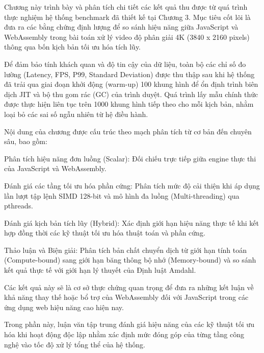 

Chương này trình bày và phân tích chi tiết các kết quả thu được từ quá trình thực nghiệm hệ thống benchmark đã thiết kế tại Chương 3. Mục tiêu cốt lõi là đưa ra các bằng chứng định lượng để so sánh hiệu năng giữa JavaScript và WebAssembly trong bài toán xử lý video độ phân giải 4K (3840 x 2160 pixels) thông qua bốn kịch bản tối ưu hóa tích lũy.


Để đảm bảo tính khách quan và độ tin cậy của dữ liệu, toàn bộ các chỉ số đo lường (Latency, FPS, P99, Standard Deviation) được thu thập sau khi hệ thống đã trải qua giai đoạn khởi động (warm-up) 100 khung hình để ổn định trình biên dịch JIT và bộ thu gom rác (GC) của trình duyệt. Quá trình lấy mẫu chính thức được thực hiện liên tục trên 1000 khung hình tiếp theo cho mỗi kịch bản, nhằm loại bỏ các sai số ngẫu nhiên từ hệ điều hành.


Nội dung của chương được cấu trúc theo mạch phân tích từ cơ bản đến chuyên sâu, bao gồm:


Phân tích hiệu năng đơn luồng (Scalar): Đối chiếu trực tiếp giữa engine thực thi của JavaScript và WebAssembly.


Đánh giá các tầng tối ưu hóa phần cứng: Phân tích mức độ cải thiện khi áp dụng lần lượt tập lệnh SIMD 128-bit và mô hình đa luồng (Multi-threading) qua pthreads.


Đánh giá kịch bản tích lũy (Hybrid): Xác định giới hạn hiệu năng thực tế khi kết hợp đồng thời các kỹ thuật tối ưu hóa thuật toán và phần cứng.


Thảo luận và Biện giải: Phân tích bản chất chuyển dịch từ giới hạn tính toán (Compute-bound) sang giới hạn băng thông bộ nhớ (Memory-bound) và so sánh kết quả thực tế với giới hạn lý thuyết của Định luật Amdahl.


Các kết quả này sẽ là cơ sở thực chứng quan trọng để đưa ra những kết luận về khả năng thay thế hoặc bổ trợ của WebAssembly đối với JavaScript trong các ứng dụng web hiệu năng cao hiện nay.



Trong phần này, luận văn tập trung đánh giá hiệu năng của các kỹ thuật tối ưu hóa khi hoạt động độc lập nhằm xác định mức đóng góp của từng tầng công nghệ vào tốc độ xử lý tổng thể của hệ thống.



